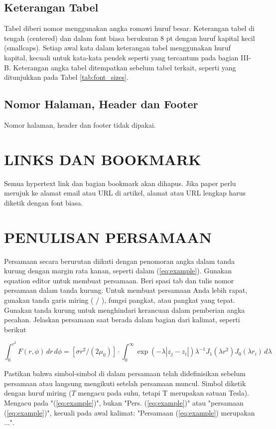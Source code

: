 \documentclass[10pt,twocolumn]{article}
\begin{document}
\subsection{Keterangan Tabel}
Tabel diberi nomor menggunakan angka romawi huruf besar. Keterangan tabel di tengah (centered) dan dalam font biasa berukuran 8 pt dengan huruf kapital kecil (smallcaps). Setiap awal kata dalam keterangan tabel menggunakan huruf kapital, kecuali untuk kata-kata pendek seperti yang tercantum pada bagian III-B. Keterangan angka tabel ditempatkan sebelum tabel terkait, seperti yang ditunjukkan pada Tabel \ref{tab:font_sizes}.

\subsection{Nomor Halaman, Header dan Footer}
Nomor halaman, header dan footer tidak dipakai.

\section{\MakeUppercase{Links dan Bookmark}}
Semua hypertext link dan bagian bookmark akan dihapus. Jika paper perlu merujuk ke alamat email atau URL di artikel, alamat atau URL lengkap harus diketik dengan font biasa.

\section{\MakeUppercase{Penulisan Persamaan}}
Persamaan secara berurutan diikuti dengan penomoran angka dalam tanda kurung dengan margin rata kanan, seperti dalam (\ref{eq:example}). Gunakan equation editor untuk membuat persamaan. Beri spasi tab dan tulis nomor persamaan dalam tanda kurung. Untuk membuat persamaan Anda lebih rapat, gunakan tanda garis miring ( / ), fungsi pangkat, atau pangkat yang tepat. Gunakan tanda kurung untuk menghindari kerancuan dalam pemberian angka pecahan. Jelaskan persamaan saat berada dalam bagian dari kalimat, seperti berikut

\begin{equation}
\int_0^{r^2} F(r,\phi) \, dr \, d\phi = [\sigma r^2/(2\mu_0)] \cdot \int_0^{\infty} \exp(-\lambda|z_j - z_i|) \lambda^{-1} J_1(\lambda r^2) J_0(\lambda r_i) \, d\lambda
\label{eq:example}
\end{equation}

Pastikan bahwa simbol-simbol di dalam persamaan telah didefinisikan sebelum persamaan atau langsung mengikuti setelah persamaan muncul. Simbol diketik dengan huruf miring ($T$ mengacu pada suhu, tetapi T merupakan satuan Tesla). Mengacu pada "(\ref{eq:example})", bukan "Pers. (\ref{eq:example})" atau "persamaan (\ref{eq:example})", kecuali pada awal kalimat: "Persamaan (\ref{eq:example}) merupakan ...".
\end{document}
